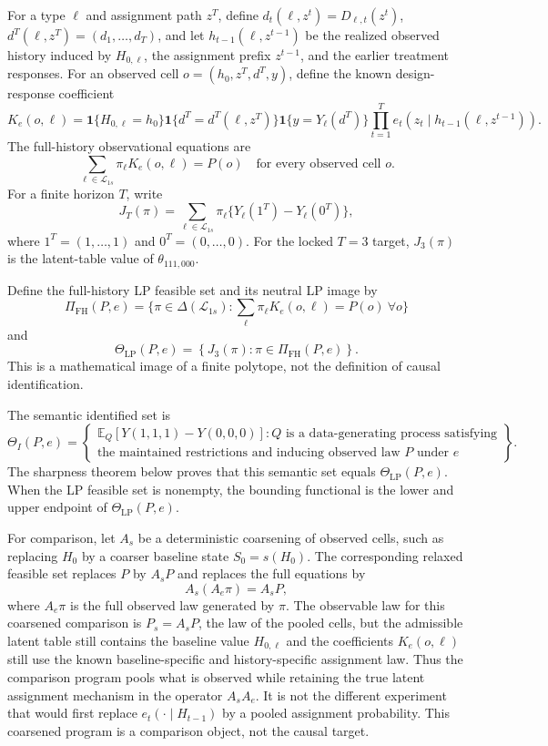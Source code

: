 \documentclass[11pt]{article}
\newcommand{\E}{\mathbb{E}}
\newcommand{\one}{\mathbf{1}}
\theoremstyle{definition}
\theoremstyle{plain}
\theoremstyle{remark}
\begin{document}
For a type \(\ell\) and assignment path \(z^T\), define \(d_t(\ell,z^t)=D_{\ell,t}(z^t)\), \(d^T(\ell,z^T)=(d_1,\ldots,d_T)\), and let \(h_{t-1}(\ell,z^{t-1})\) be the realized observed history induced by \(H_{0,\ell}\), the assignment prefix \(z^{t-1}\), and the earlier treatment responses.  For an observed cell \(o=(h_0,z^T,d^T,y)\), define the known design-response coefficient
\[
K_e(o,\ell)=
\one\{H_{0,\ell}=h_0\}
\one\{d^T=d^T(\ell,z^T)\}
\one\{y=Y_\ell(d^T)\}
\prod_{t=1}^T e_t(z_t\mid h_{t-1}(\ell,z^{t-1})).
\]
The full-history observational equations are
\[
\sum_{\ell\in\mathcal L_{1s}}\pi_\ell K_e(o,\ell)=P(o)
\quad\text{for every observed cell }o.
\]
For a finite horizon \(T\), write
\[
J_T(\pi)=
\sum_{\ell\in\mathcal L_{1s}}\pi_\ell
\{Y_\ell(1^T)-Y_\ell(0^T)\},
\]
where \(1^T=(1,\ldots,1)\) and \(0^T=(0,\ldots,0)\).  For the locked
\(T=3\) target, \(J_3(\pi)\) is the latent-table value of
\(\theta_{111,000}\).

Define the full-history LP feasible set and its neutral LP image by
\[
\Pi_{\mathrm{FH}}(P,e)=
\{\pi\in\Delta(\mathcal L_{1s}):\sum_\ell\pi_\ell K_e(o,\ell)=P(o)\ \forall o\}
\]
and
\[
\Theta_{\mathrm{LP}}(P,e)=
\left\{J_3(\pi):\pi\in\Pi_{\mathrm{FH}}(P,e)\right\}.
\]
This is a mathematical image of a finite polytope, not the definition of
causal identification.

The semantic identified set is
\[
\Theta_I(P,e)=
\left\{
\begin{array}{l}
\E_Q[Y(1,1,1)-Y(0,0,0)]:
Q\text{ is a data-generating process satisfying}\\
\text{the maintained restrictions and inducing observed law }P\text{ under }e
\end{array}
\right\}.
\]
The sharpness theorem below proves that this semantic set equals
\(\Theta_{\mathrm{LP}}(P,e)\).  When the LP feasible set is nonempty, the
bounding functional is the lower and upper endpoint of
\(\Theta_{\mathrm{LP}}(P,e)\).

For comparison, let \(A_s\) be a deterministic coarsening of observed cells, such as replacing \(H_0\) by a coarser baseline state \(S_0=s(H_0)\).  The corresponding relaxed feasible set replaces \(P\) by \(A_sP\) and replaces the full equations by
\[
A_s(A_e\pi)=A_sP,
\]
where \(A_e\pi\) is the full observed law generated by \(\pi\).  The
observable law for this coarsened comparison is \(P_s=A_sP\), the law of
the pooled cells, but the admissible latent table still contains the
baseline value \(H_{0,\ell}\) and the coefficients \(K_e(o,\ell)\) still
use the known baseline-specific and history-specific assignment law.  Thus
the comparison program pools what is observed while retaining the true
latent assignment mechanism in the operator \(A_sA_e\).  It is not the
different experiment that would first replace \(e_t(\cdot\mid H_{t-1})\)
by a pooled assignment probability.  This coarsened program is a comparison
object, not the causal target.
\end{document}
